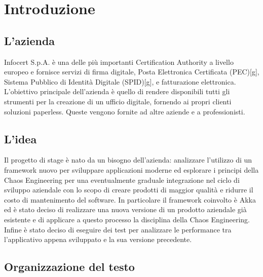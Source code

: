 
\chapter{Introduzione}
\label{cap:introduzione}

\section{L'azienda}

Infocert S.p.A. è una delle più importanti Certification Authority a livello europeo
e fornisce servizi di firma digitale, Posta Elettronica Certificata (PEC)[g], Sistema
Pubblico di Identità Digitale (SPID)[g], e fatturazione elettronica. L’obiettivo principale
dell’azienda è quello di rendere disponibili tutti gli strumenti per la creazione di un
ufficio digitale, fornendo ai propri clienti soluzioni paperless. Queste vengono fornite
ad altre aziende e a professionisti.

\section{L'idea}
Il progetto di stage è nato da un bisogno dell'azienda: analizzare l'utilizzo di un framework nuovo per sviluppare applicazioni moderne ed esplorare i principi della Chaos Engineering per una eventualmente graduale integrazione nel ciclo di sviluppo aziendale con lo scopo di creare prodotti di maggior qualità e ridurre il costo di mantenimento del software.
In particolare il framework coinvolto è Akka ed è stato deciso di realizzare una nuova versione di un prodotto aziendale già esistente e di applicare a questo processo la disciplina della Chaos Engineering.
Infine è stato deciso di eseguire dei test per analizzare le performance tra l'applicativo appena sviluppato e la sua versione precedente.

\section{Organizzazione del testo}

